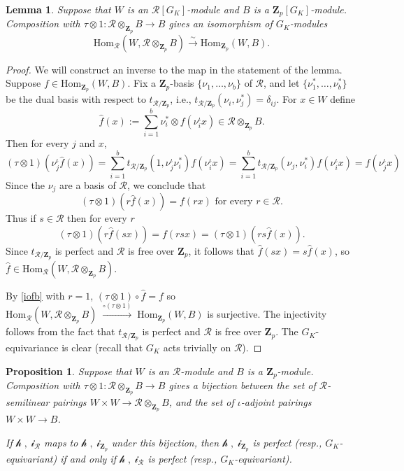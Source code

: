 \documentclass[reqno]{amsart}
\newtheorem{lem}[thm]{Lemma}
\newtheorem{prop}[thm]{Proposition}
\theoremstyle{definition}
\def\Z{\mathbf{Z}}
\def\Zp{\Z_p}
\def\cR{\mathcal{R}}
\def\T{W}
\def\ld{\mathcal{h}}
\def\rd{\mathcal{i}}
\def\Hom{\mathrm{Hom}}
\def\map#1{\;\xrightarrow{#1}\;}
\def\isom{\xrightarrow{\sim}}
\def\pair#1#2{\ld#1,#2\rd}
\begin{document}
\begin{lem}
\label{g1}
Suppose that $\T$ is an $\cR[G_K]$-module and $B$ is a $\Zp[G_K]$-module.  
Composition with $\tau \otimes 1 : \cR \otimes_{\Zp} B \to B$ 
gives an isomorphism of $G_K$-modules
$$\Hom_{\cR}(\T, \cR \otimes_{\Zp} B) \isom \Hom_{\Zp}(\T,B).$$
\end{lem}

\begin{proof}
We will construct an inverse to the map in the statement of the lemma.  
Suppose $f \in \Hom_{\Zp}(\T,B)$.  Fix a $\Zp$-basis $\{\nu_1,\ldots,\nu_b\}$ 
of $\cR$, and let $\{\nu_1^*,\ldots,\nu_b^*\}$ be the dual basis with 
respect to $t_{\cR/\Zp}$, i.e., $t_{\cR/\Zp}({\nu_i},{\nu_j^*}) = \delta_{ij}$.
For $x \in \T$ define
$$
\hat{f}(x) := \sum_{i=1}^b \nu_i^* \otimes f(\nu_i^\iota x) \in \cR \otimes_{\Zp} B.
$$
Then for every $j$ and $x$,
$$
(\tau \otimes 1)(\nu_j^\iota \hat{f}(x)) 
    = \sum_{i=1}^b t_{\cR/\Zp}({1},{\nu_j^\iota\nu_i^*}) f(\nu_i^\iota x) 
    = \sum_{i=1}^b t_{\cR/\Zp}({\nu_j},{\nu_i^*}) f(\nu_i^\iota x) = f(\nu_j^\iota x)
$$
Since the $\nu_j$ are a basis of $\cR$, we conclude that 
\begin{equation}
\label{iofb}
\text{$(\tau \otimes 1)(r \hat{f}(x)) = f(r x)$ for every $r \in \cR$}.
\end{equation}
Thus if $s \in \cR$ then for every $r$
$$
(\tau \otimes 1)(r \hat{f}(sx)) = f(rsx) = (\tau \otimes 1)(rs \hat{f}(x)).
$$
Since $t_{\cR/\Zp}$ is perfect and $\cR$ is free over $\Zp$, 
it follows that $\hat{f}(sx) = s\hat{f}(x)$, so 
$\hat{f} \in \Hom_{\cR}(\T,\cR \otimes_{\Zp} B)$.

By \eqref{iofb} with $r=1$, $(\tau \otimes 1) \circ \hat{f} = f$ so 
$\Hom_{\cR}(\T,\cR \otimes_{\Zp} B) \map{\circ(\tau\otimes 1)} \Hom_{\Zp}(\T,B)$ 
is surjective.  The injectivity follows from the fact that 
$t_{\cR/\Zp}$ is perfect and $\cR$ is free over $\Zp$.  
The $G_K$-equivariance is clear (recall that $G_K$ acts trivially on $\cR$).
\end{proof}

\begin{prop}
\label{gorprop}
Suppose that $\T$ is an $\cR$-module and $B$ is a $\Zp$-module.  
Composition with $\tau \otimes 1 : \cR \otimes_{\Zp} B \to B$ gives a 
bijection between the set of $\cR$-semilinear pairings 
$\T \times \T \to \cR \otimes_{\Zp} B$, and the set of 
$\iota$-adjoint pairings 
$\T \times \T \to B$.

If $\pair{\;}{\;}_\cR$ maps to $\pair{\;}{\;}_{\Zp}$ under this bijection, 
then $\pair{\;}{\;}_{\Zp}$ is perfect (resp., $G_K$-equivariant) 
if and only if $\pair{\;}{\;}_\cR$ is perfect (resp., $G_K$-equivariant).
\end{prop}
\end{document}
